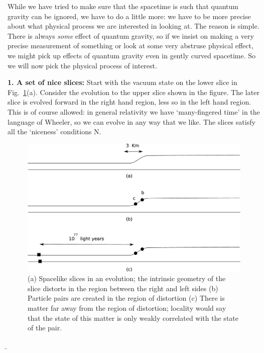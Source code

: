 \documentclass[12pt]{article}
\begin{document}
While we have tried to make sure that the spacetime is such that  quantum gravity can be ignored, we have to do a little more:  we have to be more precise about what physical process we are interested in looking at. The reason is simple. There is always {\it some} effect of quantum gravity, so if we insist on making a very precise measurement of something or look at some very abstruse physical effect, we might pick up effects of quantum gravity even in gently curved spacetime. So we will now pick the physical process of interest.

\bigskip

{\bf 1.  A set of nice slices:}  Start with the vacuum state on the lower slice in Fig.~\ref{fone}(a). Consider the evolution to the upper slice shown in the figure.  The later slice is evolved forward in the right hand region, less so in the left hand region. This is of course allowed: in general relativity we have `many-fingered time' in the language of Wheeler, so we can evolve in any way that we like. The slices satisfy all the `niceness' conditions N. 

\begin{figure}[tbp]
\begin{center}
\includegraphics[scale=.15]{fone.eps}
\caption{(a) Spacelike slices in an evolution; the intrinsic geometry of the slice distorts in the region between the right and left sides (b) Particle pairs are created in the region of distortion (c) There is matter far away from the region of distortion; locality would say that the state of this matter is only weakly correlated with the state of the pair.}
\label{fone}
\end{center}
\end{figure}


\b
\end{document}
